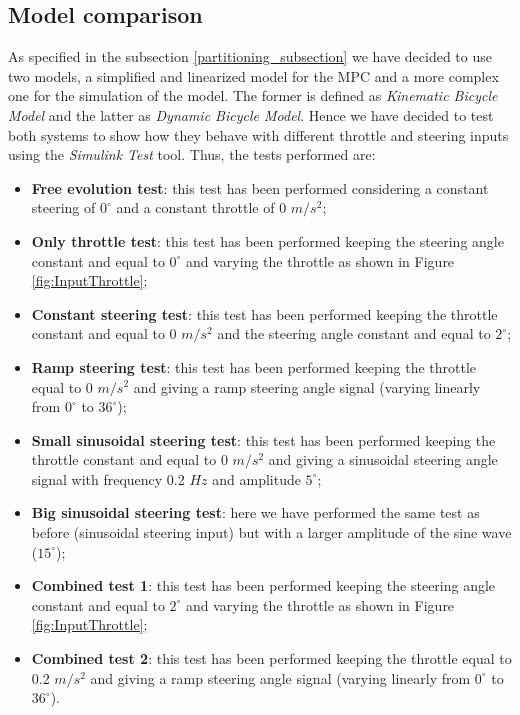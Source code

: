 \subsection{Model comparison}
As specified in the subsection \ref{partitioning_subsection} we have decided to use two models, a simplified and linearized model for the MPC and a more complex one for the simulation of the model. The former is defined as \textit{Kinematic Bicycle Model} and the latter as \textit{Dynamic Bicycle Model}.
Hence we have decided to test both systems to show how they behave with different throttle and steering inputs using the \textit{Simulink Test} tool. Thus, the tests performed are:
\begin{itemize}
    \item \textbf{Free evolution test}: this test has been performed considering a constant steering of $0^{\circ}$ and a constant throttle of 0 $m/s^2$;
    \item \textbf{Only throttle test}: this test has been performed keeping the steering angle constant and equal to $0^{\circ}$ and varying the throttle as shown in Figure \ref{fig:InputThrottle};
    \item \textbf{Constant steering test}: this test has been performed keeping the throttle constant and equal to 0 $m/s^2$ and the steering angle constant and equal to $2^{\circ}$;
    \item \textbf{Ramp steering test}: this test has been performed keeping the throttle equal to 0 $m/s^2$ and giving a ramp steering angle signal (varying linearly from $0^{\circ}$ to $36^{\circ}$);
    \item \textbf{Small sinusoidal steering test}: this test has been performed keeping the throttle constant and equal to 0 $m/s^2$ and giving a sinusoidal steering angle signal with frequency 0.2 $Hz$ and amplitude $5^{\circ}$;
    \item \textbf{Big sinusoidal steering test}: here we have performed the same test as before (sinusoidal steering input) but with a larger amplitude of the sine wave ($15^{\circ}$);
    \item \textbf{Combined test 1}: this test has been performed keeping the steering angle constant and equal to $2^{\circ}$ and varying the throttle as shown in Figure \ref{fig:InputThrottle};
    \item \textbf{Combined test 2}: this test has been performed keeping the throttle equal to 0.2 $m/s^2$ and giving a ramp steering angle signal (varying linearly from $0^{\circ}$ to $36^{\circ}$).
\end{itemize}

